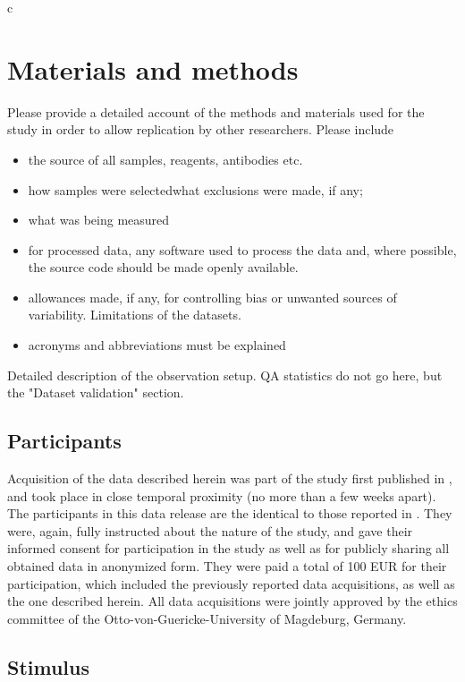 c\section*{Materials and methods} 
Please provide a detailed account of the methods and materials used for the study in order to allow replication by other researchers.
Please include \begin{itemize}
\item 
the source of all samples, reagents, antibodies etc.
\item 
 how samples were selectedwhat exclusions were made, if any;
\item 
what was being measured
\item 
for processed data, any software used to process the data and, where possible, the source code should be made openly available.\item 

allowances made, if any, for controlling bias or unwanted sources of variability.
Limitations of the datasets.\item 

acronyms and abbreviations must be explained
\end{itemize}

Detailed description of the observation setup. QA statistics do not go here, but the "Dataset validation" section.

\subsection*{Participants}
Acquisition of the data described herein was part of the study first published in \cite{Hanke_2014}, and took place in close temporal proximity (no more than a few weeks apart). The participants in this data release are the identical to those reported in \cite{Hanke_2014}.
They were, again, fully instructed about the nature of the study, and gave their informed consent for participation in the study as well as for publicly sharing all obtained data in anonymized form. They were paid a total of 100 EUR for their participation, which included the previously reported data acquisitions, as well as the one described herein. All data acquisitions were jointly approved by the ethics committee of the Otto-von-Guericke-University of Magdeburg, Germany.


\subsection*{Stimulus}

